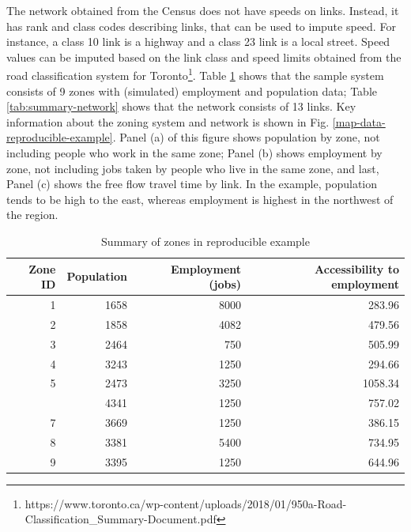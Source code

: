 \documentclass[]{elsarticle} %
\begin{document}
The network obtained from the Census does not have speeds on links.
Instead, it has rank and class codes describing links, that can be used
to impute speed. For instance, a class 10 link is a highway and a class
23 link is a local street. Speed values can be imputed based on the link
class and speed limits obtained from the road classification system for
Toronto\footnote{https://www.toronto.ca/wp-content/uploads/2018/01/950a-Road-Classification\_Summary-Document.pdf}.
Table \ref{tab:summary-data} shows that the sample system consists of 9
zones with (simulated) employment and population data; Table
\ref{tab:summary-network} shows that the network consists of 13 links.
Key information about the zoning system and network is shown in Fig.
\ref{map-data-reproducible-example}. Panel (a) of this figure shows
population by zone, not including people who work in the same zone;
Panel (b) shows employment by zone, not including jobs taken by people
who live in the same zone, and last, Panel (c) shows the free flow
travel time by link. In the example, population tends to be high to the
east, whereas employment is highest in the northwest of the region.

\begin{table}[!h]

\caption{\label{tab:summary-data-reproducible-example}\label{tab:summary-data}Summary of zones in reproducible example}
\centering
\begin{tabular}[t]{rrrr}
\toprule
Zone ID & Population & Employment (jobs) & Accessibility to employment\\
\midrule
1 & 1658 & 8000 & 283.96\\
2 & 1858 & 4082 & 479.56\\
3 & 2464 & 750 & 505.99\\
4 & 3243 & 1250 & 294.66\\
5 & 2473 & 3250 & 1058.34\\
\addlinespace
6 & 4341 & 1250 & 757.02\\
7 & 3669 & 1250 & 386.15\\
8 & 3381 & 5400 & 734.95\\
9 & 3395 & 1250 & 644.96\\
\bottomrule
\end{tabular}
\end{table}
\end{document}
